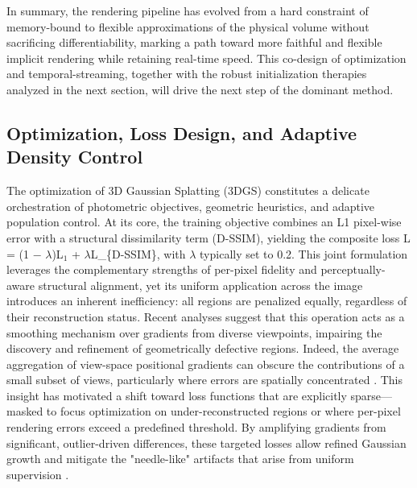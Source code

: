\documentclass[11pt,a4paper]{article}
\begin{document}
In summary, the rendering pipeline has evolved from a hard constraint of memory-bound to flexible approximations of the physical volume without sacrificing differentiability, marking a path toward more faithful and flexible implicit rendering while retaining real-time speed. This co-design of optimization and temporal-streaming, together with the robust initialization therapies analyzed in the next section, will drive the next step of the dominant method.


\subsection{Optimization, Loss Design, and Adaptive Density Control}


The optimization of 3D Gaussian Splatting (3DGS) constitutes a delicate orchestration of photometric objectives, geometric heuristics, and adaptive population control. At its core, the training objective combines an L1 pixel-wise error with a structural dissimilarity term (D-SSIM), yielding the composite loss L = (1 $-$ $\lambda$)L$_{1}$ + $\lambda$L\_\{D-SSIM\}, with $\lambda$ typically set to 0.2. This joint formulation leverages the complementary strengths of per-pixel fidelity and perceptually-aware structural alignment, yet its uniform application across the image introduces an inherent inefficiency: all regions are penalized equally, regardless of their reconstruction status. Recent analyses suggest that this operation acts as a smoothing mechanism over gradients from diverse viewpoints, impairing the discovery and refinement of geometrically defective regions. Indeed, the average aggregation of view-space positional gradients can obscure the contributions of a small subset of views, particularly where errors are spatially concentrated \cite{arxiv:2404.04211v1}. This insight has motivated a shift toward loss functions that are explicitly sparse---masked to focus optimization on under-reconstructed regions or where per-pixel rendering errors exceed a predefined threshold. By amplifying gradients from significant, outlier-driven differences, these targeted losses allow refined Gaussian growth and mitigate the "needle-like" artifacts that arise from uniform supervision \cite{arxiv:2404.04211v1}.
\end{document}
